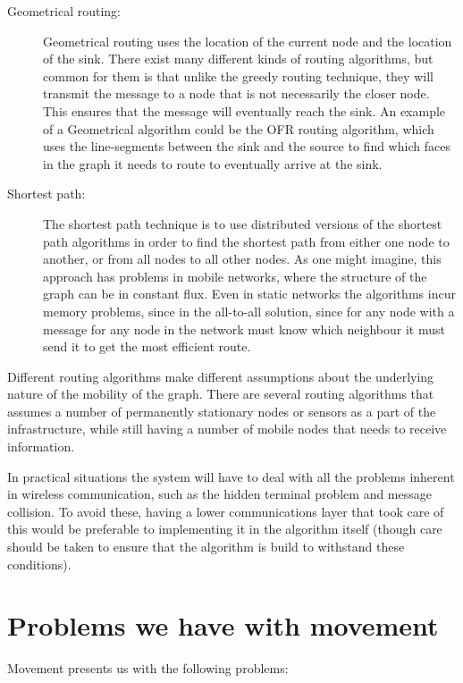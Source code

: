 \documentclass[letter, 12pt, english, draft]{article}
\begin{document}
\begin{description}
\item[Geometrical routing:] Geometrical routing uses the location of the current node and the location of the sink. There exist many different kinds of routing algorithms, but common for them is that unlike the greedy routing technique, they will transmit the message to a node that is not necessarily the closer node. This ensures that the message will eventually reach the sink. An example of a Geometrical algorithm could be the OFR \cite{gopher} routing algorithm, which uses the line-segments between the sink and the source to find which faces in the graph it needs to route to eventually arrive at the sink.

\item[Shortest path:] The shortest path technique is to use distributed versions of the shortest path algorithms in order to find the shortest path from either one node to another, or from all nodes to all other nodes. As one might imagine, this approach has problems in mobile networks, where the structure of the graph can be in constant flux. Even in static networks the algorithms incur memory problems, since in the all-to-all solution, since for any node with a message for any node in the network must know which neighbour it must send it to get the most efficient route.  
\end{description}

Different routing algorithms make different assumptions about the underlying nature of the mobility of the graph. There are several routing algorithms \cite{two-tier}\cite{adaptive} that assumes a number of permanently stationary nodes or sensors as a part of the infrastructure, while still having a number of mobile nodes that needs to receive information. 

In practical situations the system will have to deal with all the problems inherent in wireless communication, such as the hidden terminal problem and message collision. To avoid these, having a lower communications layer that took care of this would be preferable to implementing it in the algorithm itself (though care should be taken to ensure that the algorithm is build to withstand these conditions).

\section{Problems we have with movement}

Movement presents us with the following problems:
\end{document}
